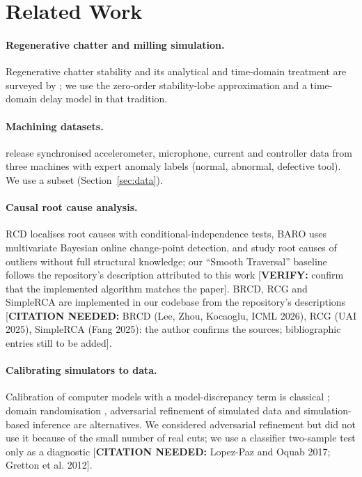 \documentclass[11pt]{article}
\newcommand{\cn}[1]{{\color{orange}[\textbf{CITATION NEEDED:} #1]}}
\newcommand{\verify}[1]{{\color{blue}[\textbf{VERIFY:} #1]}}
\begin{document}
\section{Related Work}
\paragraph{Regenerative chatter and milling simulation.}
Regenerative chatter stability and its analytical and time-domain treatment are surveyed by \citet{altintas2020}; we use the zero-order stability-lobe approximation and a time-domain delay model in that tradition.

\paragraph{Machining datasets.}
\citet{kim2026msm} release synchronised accelerometer, microphone, current and controller data from three machines with expert anomaly labels (normal, abnormal, defective tool). We use a subset (Section~\ref{sec:data}).

\paragraph{Causal root cause analysis.}
RCD \citep{ikram2022rcd} localises root causes with conditional-independence tests, BARO \citep{pham2024baro} uses multivariate Bayesian online change-point detection, and \citet{orchard2025} study root causes of outliers without full structural knowledge; our ``Smooth Traversal'' baseline follows the repository's description attributed to this work \verify{confirm that the implemented algorithm matches the paper}.
BRCD, RCG and SimpleRCA are implemented in our codebase from the repository's descriptions \cn{BRCD (Lee, Zhou, Kocaoglu, ICML 2026), RCG (UAI 2025), SimpleRCA (Fang 2025): the author confirms the sources; bibliographic entries still to be added}.

\paragraph{Calibrating simulators to data.}
Calibration of computer models with a model-discrepancy term is classical \citep{kennedy2001}; domain randomisation \citep{tobin2017}, adversarial refinement of simulated data \citep{shrivastava2017} and simulation-based inference \citep{cranmer2020} are alternatives. We considered adversarial refinement but did not use it because of the small number of real cuts; we use a classifier two-sample test only as a diagnostic \cn{Lopez-Paz and Oquab 2017; Gretton et al. 2012}.
\end{document}
